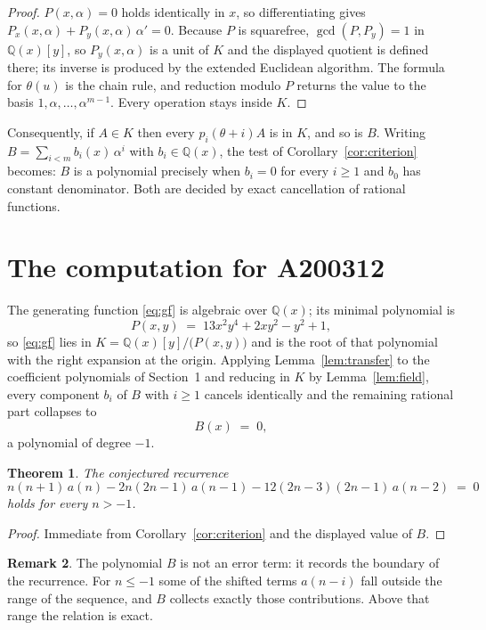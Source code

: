 \documentclass[11pt,a4paper]{article}
\theoremstyle{plain}
\newtheorem{theorem}{Theorem}
\theoremstyle{definition}
\newtheorem{remark}[theorem]{Remark}
\begin{document}
\begin{proof}
$P(x,\alpha)=0$ holds identically in $x$, so differentiating gives
$P_{x}(x,\alpha)+P_{y}(x,\alpha)\,\alpha'=0$. Because $P$ is squarefree,
$\gcd(P,P_{y})=1$ in $\mathbb{Q}(x)[y]$, so $P_{y}(x,\alpha)$ is a unit of $K$ and the
displayed quotient is defined there; its inverse is produced by the extended Euclidean
algorithm. The formula for $\theta(u)$ is the chain rule, and reduction modulo $P$ returns
the value to the basis $1,\alpha,\dots,\alpha^{m-1}$. Every operation stays inside $K$.
\end{proof}

Consequently, if $A\in K$ then every $p_{i}(\theta+i)A$ is in $K$, and so is $B$. Writing
$B=\sum_{i<m}b_{i}(x)\,\alpha^{i}$ with $b_{i}\in\mathbb{Q}(x)$, the test of
Corollary~\ref{cor:criterion} becomes: $B$ is a polynomial precisely when $b_{i}=0$ for
every $i\ge1$ and $b_{0}$ has constant denominator. Both are decided by exact
cancellation of rational functions.

\section{The computation for A200312}

The generating function \eqref{eq:gf} is algebraic over $\mathbb{Q}(x)$;
its minimal polynomial is
\[
P(x,y) \;=\; 13 x^{2} y^{4} + 2 x y^{2} - y^{2} + 1 ,
\]
so \eqref{eq:gf} lies in $K=\mathbb{Q}(x)[y]/\bigl(P(x,y)\bigr)$ and is the root of that polynomial with the right
expansion at the origin. Applying Lemma~\ref{lem:transfer} to the coefficient polynomials
of Section~1 and reducing in $K$ by Lemma~\ref{lem:field}, every component $b_{i}$ of $B$
with $i\ge1$ cancels identically and the remaining rational part collapses to
\[
B(x)\;=\;0 ,
\]
a polynomial of degree $-1$.

\begin{theorem}
The conjectured recurrence
\[
n \left(n + 1\right)\,a(n) -  2 n \left(2 n - 1\right)\,a(n-1) -  12 \left(2 n - 3\right) \left(2 n - 1\right)\,a(n-2) \;=\;0
\]
holds for every $n>-1$.
\end{theorem}

\begin{proof}
Immediate from Corollary~\ref{cor:criterion} and the displayed value of $B$.
\end{proof}

\begin{remark}
The polynomial $B$ is not an error term: it records the boundary of the recurrence. For
$n\le-1$ some of the shifted terms $a(n-i)$ fall outside the range of the sequence,
and $B$ collects exactly those contributions. Above that range the relation is exact.
\end{remark}
\end{document}
